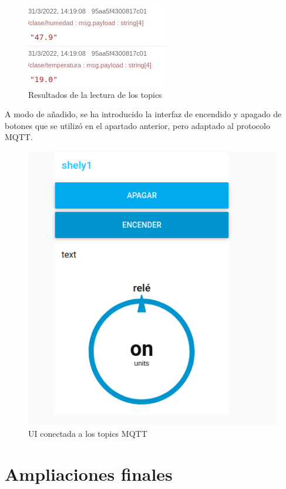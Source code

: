 \documentclass[12pt, a4paper]{article}
\begin{document}
\begin{figure}[H]
    \centering
    \includegraphics[scale=0.8]{Captura de pantalla de 2022-03-31 14-19-14.png}
    \caption{Resultados de la lectura de los topics}
\end{figure}

A modo de añadido, se ha introducido la interfaz de encendido y apagado de botones que se utilizó en el apartado anterior, pero adaptado 
al protocolo MQTT.

\begin{figure}[H]
    \centering
    \includegraphics[scale=0.8]{estadoreleybotones.png}
    \caption{UI conectada a los topics MQTT}
\end{figure}



\section{Ampliaciones finales}
\end{document}

